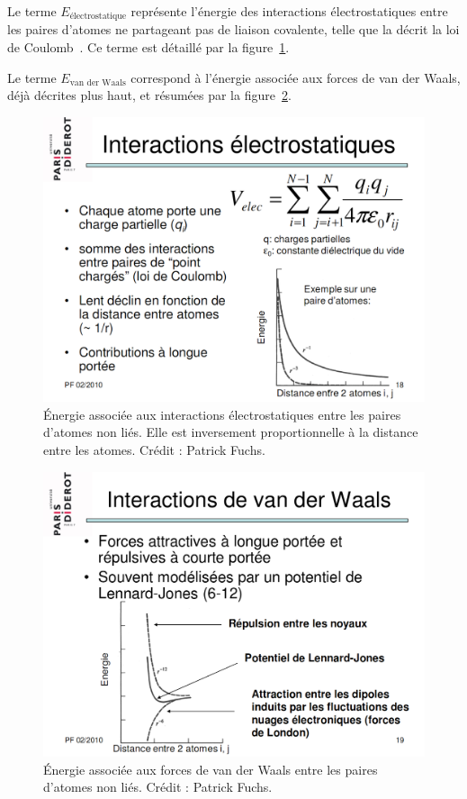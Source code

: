 	Le terme $E_\text{électrostatique}$ représente l'énergie des interactions électrostatiques entre les paires d'atomes ne partageant pas de liaison covalente, telle que la décrit la loi de Coulomb~\cite{coulomb1785premier}. Ce terme est détaillé par la figure~\ref{fig:e_electrostat}.
	
	Le terme $E_\text{van der Waals}$ correspond à l'énergie associée aux forces de van der Waals, déjà décrites plus haut, et résumées par la figure~\ref{fig:e_vdw}.
	
	\begin{figure}[H]
		\centering
		\includegraphics[width=\textwidth]{figures/ch1/e_electrostat}
		\caption[Énergie liée aux interactions électrostatiques.]{Énergie associée aux interactions électrostatiques entre les paires d'atomes non liés. Elle est inversement proportionnelle à la distance entre les atomes. Crédit : Patrick Fuchs.}
		\label{fig:e_electrostat}
	\end{figure}
	
	\begin{figure}[H]
		\centering
		\includegraphics[width=\textwidth]{figures/ch1/e_vdw}
		\caption[Énergie liée aux forces de van der Waals.]{Énergie associée aux forces de van der Waals entre les paires d'atomes non liés. Crédit : Patrick Fuchs.}
		\label{fig:e_vdw}
	\end{figure}	
	

